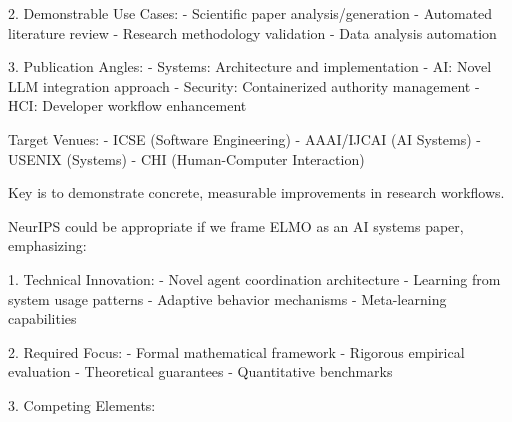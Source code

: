 2. Demonstrable Use Cases:
- Scientific paper analysis/generation
- Automated literature review
- Research methodology validation
- Data analysis automation

3. Publication Angles:
- Systems: Architecture and implementation
- AI: Novel LLM integration approach
- Security: Containerized authority management
- HCI: Developer workflow enhancement

Target Venues:
- ICSE (Software Engineering)
- AAAI/IJCAI (AI Systems)
- USENIX (Systems)
- CHI (Human-Computer Interaction)

Key is to demonstrate concrete, measurable improvements in research workflows.


NeurIPS could be appropriate if we frame ELMO as an AI systems paper, emphasizing:

1. Technical Innovation:
- Novel agent coordination architecture
- Learning from system usage patterns
- Adaptive behavior mechanisms
- Meta-learning capabilities

2. Required Focus:
- Formal mathematical framework
- Rigorous empirical evaluation
- Theoretical guarantees
- Quantitative benchmarks

3. Competing Elements: